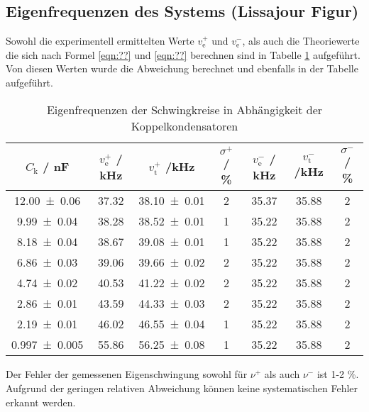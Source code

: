 \subsection{Eigenfrequenzen des Systems (Lissajour Figur)}
Sowohl die experimentell ermittelten Werte $v_\text{e}^+$ und  $v_\text{e}^-$, als auch die Theoriewerte die sich nach Formel \ref{eqn:??} und \ref{eqn:??} berechnen sind in Tabelle \ref{tab:eigen} aufgeführt. Von diesen Werten wurde die Abweichung berechnet und ebenfalls in der Tabelle aufgeführt.
\begin{table}
  \centering
  \begin{tabular}{c c c c c c c}
    \toprule
    $C_\text{k}$ / nF & $v_\text{e}^+$ / kHz & $v_\text{t}^+$ /kHz & $\sigma^+$ / \% & $v_\text{e}^-$ / kHz & $v_\text{t}^-$ /kHz & $\sigma^-$ / \%  \\
    \midrule
    \num{12.00 +- 0.06}	& 37.32	& \num{38.10 +- 0.01} & 2 & 35.37 & 35.88 & 2 \\
    \num{9.99 +- 0.04}	& 38.28	& \num{38.52 +- 0.01} & 1 & 35.22 & 35.88 & 2 \\
    \num{8.18 +- 0.04}	& 38.67 & \num{39.08 +- 0.01} & 1 & 35.22 & 35.88 & 2 \\
    \num{6.86 +- 0.03}	& 39.06 & \num{39.66 +- 0.02} & 2 & 35.22 & 35.88 & 2 \\
    \num{4.74 +- 0.02}	& 40.53 & \num{41.22 +- 0.02} & 2 & 35.22 & 35.88 & 2 \\
    \num{2.86 +- 0.01}	& 43.59 & \num{44.33 +- 0.03} & 2 & 35.22 & 35.88 & 2 \\
    \num{2.19 +- 0.01}	& 46.02 & \num{46.55 +- 0.04} & 1 & 35.22 & 35.88 & 2 \\
    \num{0.997 +- 0.005}	& 55.86 & \num{56.25 +- 0.08} & 1 & 35.22 & 35.88 & 2 \\
    \bottomrule
  \end{tabular}
  \caption{Eigenfrequenzen der Schwingkreise in Abhängigkeit der Koppelkondensatoren}
  \label{tab:eigen}
\end{table}
Der Fehler der gemessenen Eigenschwingung sowohl für $\nu^+$ als auch $\nu^-$ ist 1-2 \%. Aufgrund der geringen relativen Abweichung können keine systematischen Fehler erkannt werden.
